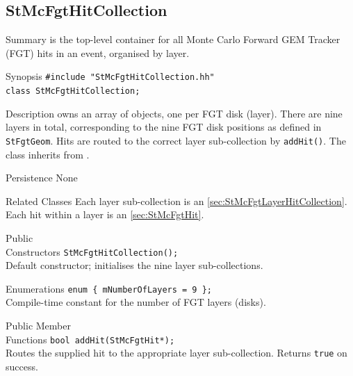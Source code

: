 \subsection{StMcFgtHitCollection}
 
\label{sec:StMcFgtHitCollection}
\begin{Entry}
\item[Summary]
     is the top-level container for all Monte
    Carlo Forward GEM Tracker (FGT) hits in an event, organised by layer.

\item[Synopsis]
    \verb+#include "StMcFgtHitCollection.hh"+\\
    \verb+class StMcFgtHitCollection;+\\

\item[Description]
     owns an array of
     objects, one per FGT disk (layer).
    There are nine layers in total, corresponding to the nine FGT disk
    positions as defined in \verb+StFgtGeom+.  Hits are routed to the
    correct layer sub-collection by \verb+addHit()+.  The class inherits
    from .

\item[Persistence]
    None

\item[Related Classes]
    Each layer sub-collection is an 
    \ref{sec:StMcFgtLayerHitCollection}.
    Each hit within a layer is an  \ref{sec:StMcFgtHit}.

\item[Public\\ Constructors]
    \verb+StMcFgtHitCollection();+\\
    Default constructor; initialises the nine layer sub-collections.

\item[Enumerations]
    \verb+enum { mNumberOfLayers = 9 };+\\
    Compile-time constant for the number of FGT layers (disks).

\item[Public Member\\ Functions]
    \verb+bool addHit(StMcFgtHit*);+\\
    Routes the supplied hit to the appropriate layer sub-collection.
    Returns \verb+true+ on success.


\end{Entry}
